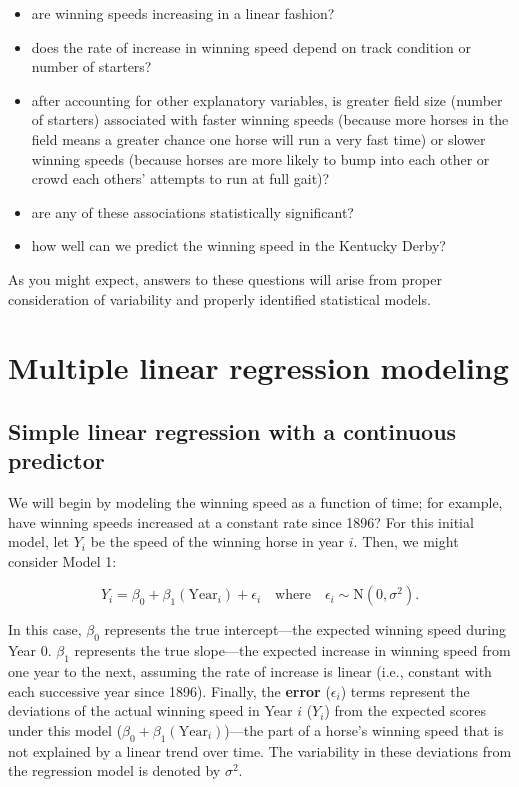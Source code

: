 \documentclass[
]{krantz}
\providecommand{\tightlist}{%
  \setlength{\itemsep}{0pt}\setlength{\parskip}{0pt}}
\begin{document}
\begin{itemize}
\tightlist
\item
  are winning speeds increasing in a linear fashion?
\item
  does the rate of increase in winning speed depend on track condition or number of starters?
\item
  after accounting for other explanatory variables, is greater field size (number of starters) associated with faster winning speeds (because more horses in the field means a greater chance one horse will run a very fast time) or slower winning speeds (because horses are more likely to bump into each other or crowd each others' attempts to run at full gait)?
\item
  are any of these associations statistically significant?
\item
  how well can we predict the winning speed in the Kentucky Derby?
\end{itemize}

As you might expect, answers to these questions will arise from proper consideration of variability and properly identified statistical models.

\hypertarget{multreg}{%
\section{Multiple linear regression modeling}\label{multreg}}

\hypertarget{SLRcontinuous}{%
\subsection{Simple linear regression with a continuous predictor}\label{SLRcontinuous}}

We will begin by modeling the winning speed as a function of time; for example, have winning speeds increased at a constant rate since 1896? For this initial model, let \(Y_{i}\) be the speed of the winning horse in year \(i\). Then, we might consider Model 1:

\begin{equation}
 Y_{i}=\beta_{0}+\beta_{1}(\textrm{Year}_{i})+\epsilon_{i} \quad \textrm{where} \quad \epsilon_{i}\sim \textrm{N}(0,\sigma^2).
\label{eq:model1}
\end{equation}

In this case, \(\beta_{0}\) represents the true intercept---the expected winning speed during Year 0. \(\beta_{1}\) represents the true slope---the expected increase in winning speed from one year to the next, assuming the rate of increase is linear (i.e., constant with each successive year since 1896). Finally, the \textbf{error} (\(\epsilon_{i}\)) terms represent the deviations of the actual winning speed in Year \(i\) (\(Y_i\)) from the expected scores under this model (\(\beta_{0}+\beta_{1}(\textrm{Year}_{i})\))---the part of a horse's winning speed that is not explained by a linear trend over time. The variability in these deviations from the regression model is denoted by \(\sigma^2\).
\end{document}
